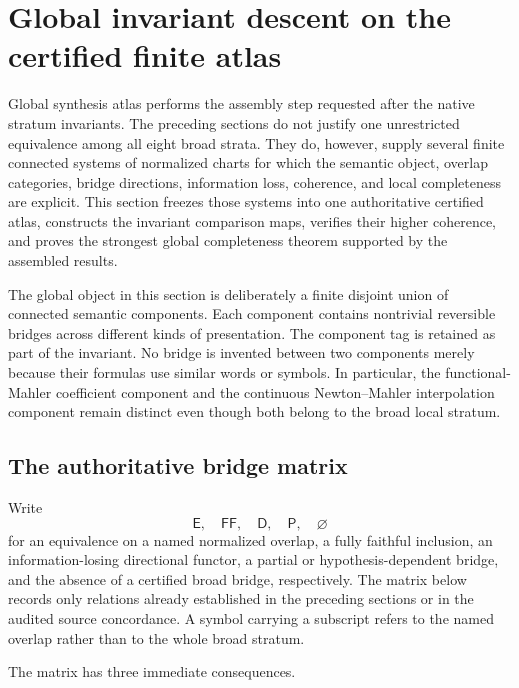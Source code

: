\section{Global invariant descent on the certified finite atlas}
\label{sec:block13-global-invariant}

Global synthesis atlas performs the assembly step requested after the native stratum invariants.  The preceding sections do not justify one unrestricted equivalence among all eight broad strata.  They do, however, supply several finite connected systems of normalized charts for which the semantic object, overlap categories, bridge directions, information loss, coherence, and local completeness are explicit.  This section freezes those systems into one authoritative certified atlas, constructs the invariant comparison maps, verifies their higher coherence, and proves the strongest global completeness theorem supported by the assembled results.

The global object in this section is deliberately a finite disjoint union of connected semantic components.  Each component contains nontrivial reversible bridges across different kinds of presentation.  The component tag is retained as part of the invariant.  No bridge is invented between two components merely because their formulas use similar words or symbols.  In particular, the functional-Mahler coefficient component and the continuous Newton--Mahler interpolation component remain distinct even though both belong to the broad local stratum.

\subsection{The authoritative bridge matrix}
\label{subsec:block13-bridge-matrix}

Write
\[
 \mathsf E,
 \quad
 \mathsf{FF},
 \quad
 \mathsf D,
 \quad
 \mathsf P,
 \quad
 \varnothing
\]
for an equivalence on a named normalized overlap, a fully faithful inclusion, an information-losing directional functor, a partial or hypothesis-dependent bridge, and the absence of a certified broad bridge, respectively.  The matrix below records only relations already established in the preceding sections or in the audited source concordance.  A symbol carrying a subscript refers to the named overlap rather than to the whole broad stratum.



The matrix has three immediate consequences.

